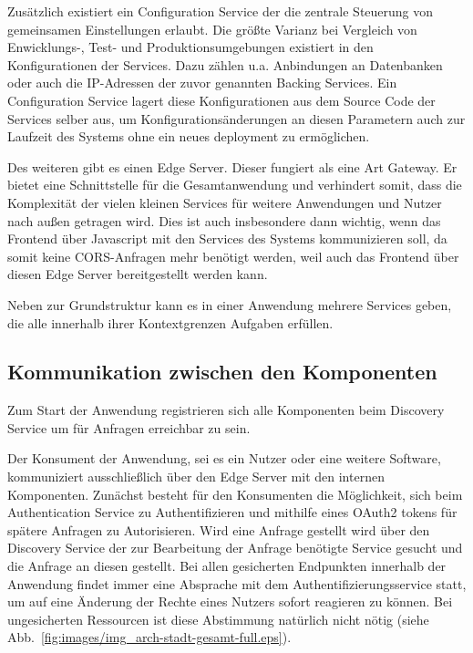 \documentclass[12pt,a4paper,bibliography=totocnumbered,listof=totocnumbered]{scrartcl}
\begin{document}
Zusätzlich existiert ein Configuration Service der die zentrale Steuerung von gemeinsamen Einstellungen erlaubt. Die größte Varianz bei Vergleich von Enwicklungs-, Test- und Produktionsumgebungen existiert in den Konfigurationen der Services. Dazu zählen u.a. Anbindungen an Datenbanken oder auch die IP-Adressen der zuvor genannten Backing Services\cite{wiggins}. Ein Configuration Service lagert diese Konfigurationen aus dem Source Code der Services selber aus, um Konfigurationsänderungen an diesen Parametern auch zur Laufzeit des Systems ohne ein neues deployment zu ermöglichen.

Des weiteren gibt es einen Edge Server. Dieser fungiert als eine Art Gateway. Er bietet eine Schnittstelle für die Gesamtanwendung und verhindert somit, dass die Komplexität der vielen kleinen Services für weitere Anwendungen und Nutzer nach außen getragen wird. Dies ist auch insbesondere dann wichtig, wenn das Frontend über Javascript mit den Services des Systems kommunizieren soll, da somit keine \ac{CORS}-Anfragen mehr benötigt werden, weil auch das Frontend über diesen Edge Server bereitgestellt werden kann.

Neben zur Grundstruktur kann es in einer Anwendung mehrere Services geben, die alle innerhalb ihrer Kontextgrenzen Aufgaben erfüllen. 


\subsection{Kommunikation zwischen den Komponenten}

Zum Start der Anwendung registrieren sich alle Komponenten beim Discovery Service um für Anfragen erreichbar zu sein.

Der Konsument der Anwendung, sei es ein Nutzer oder eine weitere Software, kommuniziert ausschließlich über den Edge Server mit den internen Komponenten. Zunächst besteht für den Konsumenten die Möglichkeit, sich beim Authentication Service zu Authentifizieren und mithilfe eines OAuth2 tokens für spätere Anfragen zu Autorisieren. Wird eine Anfrage gestellt wird über den Discovery Service der zur Bearbeitung der Anfrage benötigte Service gesucht und die Anfrage an diesen gestellt. Bei allen gesicherten Endpunkten innerhalb der Anwendung findet immer eine Absprache mit dem Authentifizierungsservice statt, um auf eine Änderung der Rechte eines Nutzers sofort reagieren zu können. Bei ungesicherten Ressourcen ist diese Abstimmung natürlich nicht nötig (siehe Abb.~\ref{fig:images/img_arch-stadt-gesamt-full.eps}).
\end{document}
